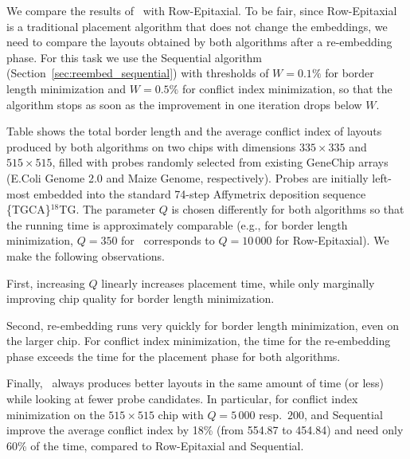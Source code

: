 We compare the results of \Greedyplus\ with Row-Epitaxial. To be fair,
since Row-Epitaxial is a traditional placement algorithm that does not
change the embeddings, we need to compare the layouts obtained by both
algorithms after a re-embedding phase. For this task we use the
Sequential algorithm (Section~\ref{sec:reembed_sequential}) with
thresholds of $W=0.1\%$ for border length minimization and $W=0.5\%$
for conflict index minimization, so that the algorithm stops as soon
as the improvement in one iteration drops below $W$.

Table shows the total border length and the
average conflict index of layouts produced by both algorithms on two
chips with dimensions $335 \times 335$ and $515 \times 515$, filled
with probes randomly selected from existing GeneChip arrays (E.Coli
Genome 2.0 and Maize Genome, respectively). Probes are initially
left-most embedded into the standard 74-step Affymetrix deposition
sequence \{TGCA\}$^{18}$TG. The parameter $Q$ is chosen differently
for both algorithms so that the running time is approximately
comparable (e.g., for border length minimization, $Q=350$ for
\Greedyplus\ corresponds to $Q=10\,000$ for Row-Epitaxial). We make
the following observations.

First, increasing $Q$ linearly increases placement time, while only
marginally improving chip quality for border length minimization.

Second, re-embedding runs very quickly for border length minimization,
even on the larger chip. For conflict index minimization, the time for
the re-embedding phase exceeds the time for the placement phase for
both algorithms.

Finally, \Greedyplus\ always produces better layouts in the same amount of
time (or less) while looking at fewer probe candidates.  In particular, for
conflict index minimization on the $515\times 515$ chip with $Q=5\,000$ resp.\ 
$200$, \Greedyplus\;and Sequential improve the average conflict index by 18\%
(from 554.87 to 454.84) and need only 60\% of the time, compared to
Row-Epitaxial and Sequential.

